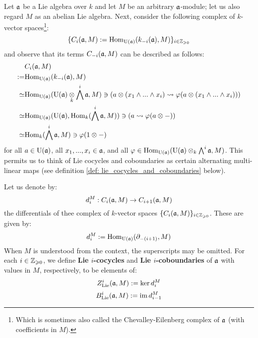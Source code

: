         \begin{remark} \label{remark: simplified_chevalley_eilenberg_complexes}
            Let $\mathfrak{a}$ be a Lie algebra over $k$ and let $M$ be an arbitrary $\mathfrak{a}$-module; let us also regard $M$ as an abelian Lie algebra. Next, consider the following complex of $k$-vector spaces\footnote{Which is sometimes also called the Chevalley-Eilenberg complex of $\mathfrak{a}$ (with coefficients in $M$).}:
                $$\{ C_i(\mathfrak{a}, M) := \mathrm{Hom}_{\mathrm{U}(\mathfrak{a})}(k_{-i}(\mathfrak{a}), M) \}_{i \in \mathbb{Z}_{\geqslant 0}}$$
            and observe that its terms $C_{-i}(\mathfrak{a}, M)$ can be described as follows:
                $$
                    \begin{aligned}
                        & C_i(\a, M)
                        \\
                        := & \Hom_{\rmU(\a)}(k_{-i}(\a), M)
                        \\
                        \cong & \Hom_{\rmU(\a)}( \rmU(\a) \tensor_k \bigwedge^i \a, M ) \ni \left( a \tensor (x_1 \wedge ... \wedge x_i) \mapsto \varphi( a \tensor (x_1 \wedge ... \wedge x_i) ) \right)
                        \\
                        \cong & \Hom_{\rmU(\a)}( \rmU(\a), \Hom_k( \bigwedge^i \a, M ) ) \ni \left( a \mapsto \varphi(a \tensor -) \right)
                        \\
                        \cong & \Hom_k( \bigwedge^i \a, M ) \ni \varphi(1 \tensor -)
                    \end{aligned}
                $$
            for all $a \in \mathrm{U}(\mathfrak{a})$, all $x_1, ..., x_i \in \mathfrak{a}$, and all $\varphi \in \Hom_{\rmU(\a)}( \rmU(\a) \tensor_k \bigwedge^i \a, M )$. This permits us to think of Lie cocycles and coboundaries as certain alternating multi-linear maps (see definition \ref{def: lie_cocycles_and_coboundaries} below).
        \end{remark}
        \begin{definition} \label{def: lie_cocycles_and_coboundaries}
            Let us denote by:
                $$d_i^M: C_i(\mathfrak{a}, M) \to C_{i + 1}(\mathfrak{a}, M)$$
            the differentials of thee complex of $k$-vector spaces $\{C_i(\mathfrak{a}, M)\}_{i \in \mathbb{Z}_{\geqslant 0}}$. These are given by:
                $$d_i^M := \mathrm{Hom}_{\mathrm{U}(\mathfrak{a})}(\partial_{-(i + 1)}, M)$$
            When $M$ is understood from the context, the superscripts may be omitted. For each $i \in \mathbb{Z}_{\geqslant 0}$, we define \textbf{Lie $i$-cocycles} and \textbf{Lie $i$-coboundaries} of $\mathfrak{a}$ with values in $M$, respectively, to be elements of:
                $$Z^i_{\mathrm{Lie}}(\mathfrak{a}, M) := \ker d_i^M$$
                $$B^i_{\mathrm{Lie}}(\mathfrak{a}, M) := \operatorname{im} d_{i - 1}^M$$
        \end{definition}
